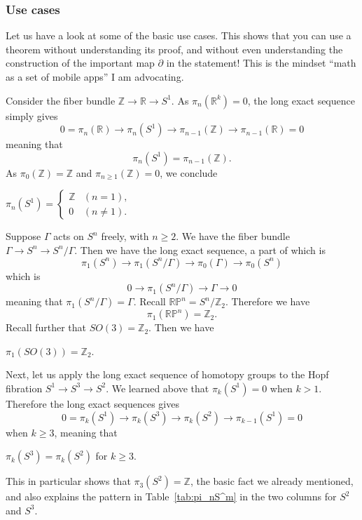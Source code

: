 \documentclass[12pt]{article}
\numberwithin{equation}{section}
\theoremstyle{remark}
\def\bR{\mathbb{R}}
\def\bZ{\mathbb{Z}}
\def\RP{\mathbb{RP}}
\begin{document}
\subsubsection{Use cases}
Let us have a look at some of the basic use cases. 
This shows that you can use a theorem without understanding its proof,
and without even understanding the construction of the important map $\partial$
in the statement!
This is the mindset ``math as a set of mobile apps'' I am advocating.

Consider the fiber bundle $\bZ\to \bR \to S^1$.
As $\pi_n(\bR^k)=0$, the long exact sequence simply gives
\begin{equation}
0=\pi_n(\bR)\to \pi_n(S^1)\to \pi_{n-1}(\bZ)\to \pi_{n-1}(\bR)=0
\end{equation} meaning that \begin{equation}
  \pi_n(S^1)=\pi_{n-1}(\bZ).
\end{equation} As $\pi_0(\bZ)=\bZ$ and $\pi_{n\ge 1}(\bZ)=0$,
we conclude 
\begin{example}
$
  \pi_n(S^1)=\begin{cases}
    \bZ & (n=1), \\
    0 & (n\neq 1).
  \end{cases}
$
\end{example}

Suppose $\Gamma$ acts on $S^n$ freely, with $n\ge 2$. 
We have the fiber bundle $\Gamma\to S^n\to S^n/\Gamma$.
Then we have the long exact sequence, a part of which is \begin{equation}
  \pi_1(S^n) \to \pi_1(S^n/\Gamma)\to \pi_0(\Gamma) \to \pi_0(S^n)
\end{equation} which is \begin{equation}
   0 \to \pi_1(S^n/\Gamma) \to \Gamma\to 0
\end{equation} meaning that $\pi_1(S^n/\Gamma)=\Gamma$.
Recall $\RP^n=S^n/\bZ_2$. Therefore we have \begin{equation}
  \pi_1(\RP^n)=\bZ_2.
\end{equation}
Recall further that $SO(3)=\bZ_2$. Then we have 
\begin{example}
$  \pi_1(SO(3))=\bZ_2 $.
\end{example}

Next, let us apply the long exact sequence of homotopy groups to the Hopf fibration $S^1\to S^3\to S^2$.
We learned above that $\pi_k(S^1)=0$ when $k>1$.
Therefore the long exact sequences gives \begin{equation}
  0=\pi_{k}(S^1)\to \pi_{k}(S^3)\to \pi_k(S^2)\to \pi_{k-1}(S^1)=0
\end{equation} when $k\ge 3$, meaning that 
\begin{proposition}
$  \pi_k(S^3)=\pi_k(S^2)$ for $k\ge 3$.
\end{proposition}
This in particular shows that $\pi_3(S^2)=\bZ$, the basic fact we already mentioned,
and also explains the pattern in Table~\ref{tab:pi_nS^m}
in the two columns for $S^2$ and $S^3$.
\end{document}

